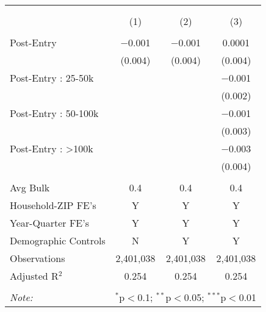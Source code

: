 
\begin{table}[!htbp] \centering 
  \caption{} 
  \label{} 
\begin{tabular}{@{\extracolsep{5pt}}lccc} 
\\[-1.8ex]\hline 
\hline \\[-1.8ex] 
\\[-1.8ex] & (1) & (2) & (3)\\ 
\hline \\[-1.8ex] 
 Post-Entry & $-$0.001 & $-$0.001 & 0.0001 \\ 
  & (0.004) & (0.004) & (0.004) \\ 
  Post-Entry : 25-50k &  &  & $-$0.001 \\ 
  &  &  & (0.002) \\ 
  Post-Entry : 50-100k &  &  & $-$0.001 \\ 
  &  &  & (0.003) \\ 
  Post-Entry : >100k &  &  & $-$0.003 \\ 
  &  &  & (0.004) \\ 
 \hline \\[-1.8ex] 
Avg Bulk & 0.4 & 0.4 & 0.4 \\ 
Household-ZIP FE's & Y & Y & Y \\ 
Year-Quarter FE's & Y & Y & Y \\ 
Demographic Controls & N & Y & Y \\ 
Observations & 2,401,038 & 2,401,038 & 2,401,038 \\ 
Adjusted R$^{2}$ & 0.254 & 0.254 & 0.254 \\ 
\hline 
\hline \\[-1.8ex] 
\textit{Note:}  & \multicolumn{3}{l}{$^{*}$p$<$0.1; $^{**}$p$<$0.05; $^{***}$p$<$0.01} \\ 
\end{tabular} 
\end{table} 
